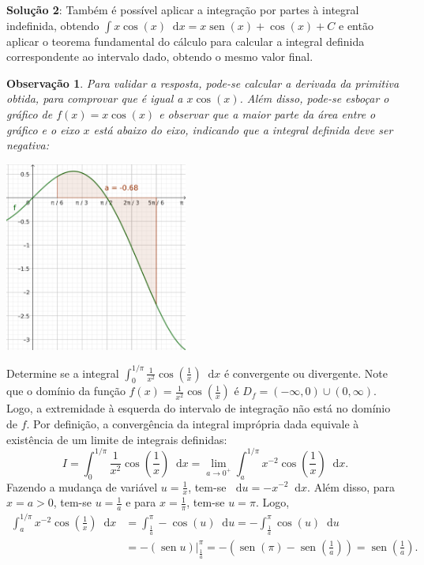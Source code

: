 \documentclass[12pt,a4paper]{article}
\newtheorem*{note}{Observação}
\newcommand*\diff{\mathop{}\!\mathrm{d}}
\newcommand*\sen{\operatorname{sen}}
\begin{document}
\begin{ExerciseList}
\textbf{Solução 2}: Também é possível aplicar a integração por partes à integral indefinida, obtendo $\int x\cos(x) \diff{x} = x\sen(x) +\cos(x) + C$ e então aplicar o teorema fundamental do cálculo para calcular a integral definida correspondente ao intervalo dado, obtendo o mesmo valor final.

\begin{note}
Para validar a resposta, pode-se calcular a derivada da primitiva obtida, para comprovar que é igual a $x \cos(x)$. Além disso, pode-se esboçar o gráfico de $f(x) = x \cos(x)$ e observar que a maior parte da área entre o gráfico e o eixo $x$ está abaixo do eixo, indicando que a integral definida deve ser negativa:

\begin{center}
\includegraphics[width=6.0cm]{img/prova-1-nex-integral-por-partes.pdf}
\end{center}
\end{note}

\Exercise[title={2,0}]
Determine se a integral $\int_0^{1/\pi} \frac{1}{x^2} \cos\left(\frac{1}{x}\right) \diff{x}$ é convergente ou divergente.
\Answer Note que o domínio da função $f(x) = \frac{1}{x^2} \cos\left(\frac{1}{x}\right)$ é $D_f = (-\infty, 0) \cup (0, \infty)$. Logo, a extremidade à esquerda do intervalo de integração não está no domínio de $f$. Por definição, a convergência da integral imprópria dada equivale à existência de um limite de integrais definidas:
\[
I
= \int_0^{1/\pi} \frac{1}{x^2} \cos\left(\frac{1}{x}\right) \diff{x}
= \lim_{a\to 0^+} \int_a^{1/\pi} x^{-2} \cos\left(\frac{1}{x}\right) \diff{x}.
\]
Fazendo a mudança de variável $u = \frac{1}{x}$, tem-se $\diff{u} = -x^{-2}\diff{x}$. Além disso, para $x = a > 0$, tem-se $u = \frac{1}{a}$ e para $x = \frac{1}{\pi}$, tem-se $u = \pi$. Logo,
\begin{align*}
  \int_a^{1/\pi} x^{-2} \cos\left(\frac{1}{x}\right) \diff{x}
  & = \int_{\frac{1}{a}}^{\pi} - \cos\left(u\right) \diff{u}
    = - \int_{\frac{1}{a}}^{\pi} \cos\left(u\right) \diff{u} \\
  & = - \left(\sen{u} \right)\bigg\rvert_{\frac{1}{a}}^{\pi}
    = - \left(\sen(\pi) - \sen\left(\frac{1}{a}\right)\right)
    = \sen\left(\frac{1}{a}\right).
\end{align*}


\end{ExerciseList}
\end{document}
